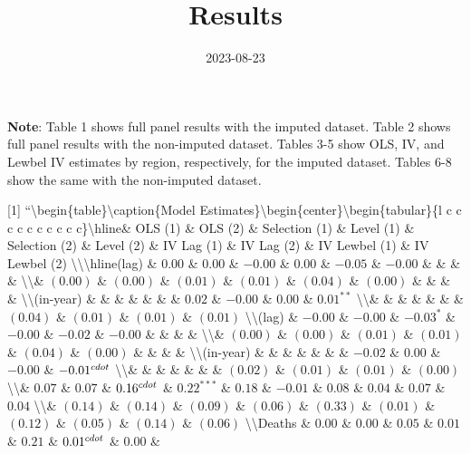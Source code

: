 \documentclass[
]{article}
\title{Results}
\author{}
\date{\vspace{-2.5em}2023-08-23}
\begin{document}
\maketitle

\textbf{Note}: Table 1 shows full panel results with the imputed
dataset. Table 2 shows full panel results with the non-imputed dataset.
Tables 3-5 show OLS, IV, and Lewbel IV estimates by region,
respectively, for the imputed dataset. Tables 6-8 show the same with the
non-imputed dataset.

{[}1{]} ``\n\textbackslash begin\{table\}\n\textbackslash caption\{Model
Estimates\}\n\textbackslash begin\{center\}\n\textbackslash begin\{tabular\}\{l
c c c c c c c c c c\}\n\textbackslash hline\n \& OLS (1) \& OLS (2) \&
Selection (1) \& Level (1) \& Selection (2) \& Level (2) \& IV Lag (1)
\& IV Lag (2) \& IV Lewbel (1) \& IV Lewbel (2)
\textbackslash\textbackslash{}\n\textbackslash hline\nODA (lag) \&
\(0.00\) \& \(0.00\) \& \(-0.00\) \& \(0.00\) \& \(-0.05\) \& \(-0.00\)
\& \& \& \& \textbackslash\textbackslash{}\n                   \&
\((0.00)\) \& \((0.00)\) \& \((0.01)\) \& \((0.01)\) \& \((0.04)\) \&
\((0.00)\) \& \& \& \& \textbackslash\textbackslash{}\nODA (in-year) \&
\& \& \& \& \& \& \(0.02\) \& \(-0.00\) \& \(0.00\) \& \(0.01^{**}\)
\textbackslash\textbackslash{}\n                   \& \& \& \& \& \& \&
\((0.04)\) \& \((0.01)\) \& \((0.01)\) \& \((0.01)\)
\textbackslash\textbackslash{}\nOOF (lag) \& \(-0.00\) \& \(-0.00\) \&
\(-0.03^{*}\) \& \(-0.00\) \& \(-0.02\) \& \(-0.00\) \& \& \& \&
\textbackslash\textbackslash{}\n                   \& \((0.00)\) \&
\((0.00)\) \& \((0.01)\) \& \((0.01)\) \& \((0.04)\) \& \((0.00)\) \& \&
\& \& \textbackslash\textbackslash{}\nOOF (in-year) \& \& \& \& \& \& \&
\(-0.02\) \& \(0.00\) \& \(-0.00\) \& \(-0.01^{\\cdot}\)
\textbackslash\textbackslash{}\n                   \& \& \& \& \& \& \&
\((0.02)\) \& \((0.01)\) \& \((0.01)\) \& \((0.00)\)
\textbackslash\textbackslash{}\nPopulation         \& \(0.07\) \&
\(0.07\) \& \(0.16^{\\cdot}\) \& \(0.22^{***}\) \& \(0.18\) \& \(-0.01\)
\& \(0.08\) \& \(0.04\) \& \(0.07\) \& \(0.04\)
\textbackslash\textbackslash{}\n                   \& \((0.14)\) \&
\((0.14)\) \& \((0.09)\) \& \((0.06)\) \& \((0.33)\) \& \((0.01)\) \&
\((0.12)\) \& \((0.05)\) \& \((0.14)\) \& \((0.06)\)
\textbackslash\textbackslash{}\nDisaster Deaths \& \(0.00\) \& \(0.00\)
\& \(0.05\) \& \(0.01\) \& \(0.21\) \& \(0.01^{\\cdot}\) \& \(0.00\) \&
\end{document}
